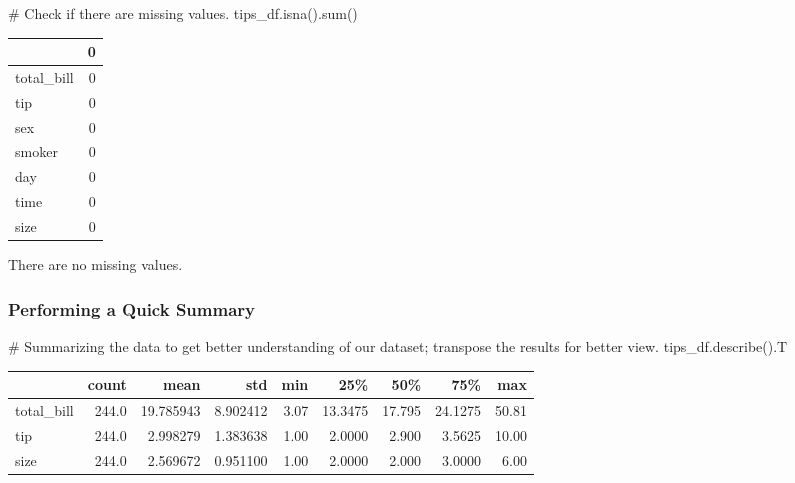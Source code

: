 \documentclass[
  letterpaper,
  DIV=11,
  numbers=noendperiod]{scrartcl}
\newenvironment{Shaded}{\begin{snugshade}}{\end{snugshade}}
\newcommand{\BuiltInTok}[1]{\textcolor[rgb]{0.00,0.46,0.62}{#1}}
\newcommand{\CommentTok}[1]{\textcolor[rgb]{0.37,0.37,0.37}{#1}}
\newcommand{\NormalTok}[1]{\textcolor[rgb]{0.00,0.46,0.62}{#1}}
\begin{document}
\begin{Shaded}
\begin{Highlighting}[]
\CommentTok{\# Check if there are missing values.}
\NormalTok{tips\_df.isna().}\BuiltInTok{sum}\NormalTok{()}
\end{Highlighting}
\end{Shaded}

\begin{tabular}{lr}
\toprule
{} &  0 \\
\midrule
total\_bill &  0 \\
tip        &  0 \\
sex        &  0 \\
smoker     &  0 \\
day        &  0 \\
time       &  0 \\
size       &  0 \\
\bottomrule
\end{tabular}

There are no missing values.

\hypertarget{performing-a-quick-summary}{%
\subsubsection{Performing a Quick
Summary}\label{performing-a-quick-summary}}

\begin{Shaded}
\begin{Highlighting}[]
\CommentTok{\# Summarizing the data to get better understanding of our dataset; transpose the results for better view.}
\NormalTok{tips\_df.describe().T}
\end{Highlighting}
\end{Shaded}

\begin{tabular}{lrrrrrrrr}
\toprule
{} &  count &       mean &       std &   min &      25\% &     50\% &      75\% &    max \\
\midrule
total\_bill &  244.0 &  19.785943 &  8.902412 &  3.07 &  13.3475 &  17.795 &  24.1275 &  50.81 \\
tip        &  244.0 &   2.998279 &  1.383638 &  1.00 &   2.0000 &   2.900 &   3.5625 &  10.00 \\
size       &  244.0 &   2.569672 &  0.951100 &  1.00 &   2.0000 &   2.000 &   3.0000 &   6.00 \\
\bottomrule
\end{tabular}
\end{document}
